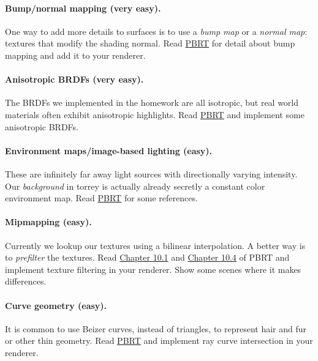 \paragraph{Bump/normal mapping (very easy).}
One way to add more details to surfaces is to use a \emph{bump map} or a \emph{normal map}: textures that modify the shading normal. Read \href{https://www.pbr-book.org/3ed-2018/Materials/Bump_Mapping}{PBRT} for detail about bump mapping and add it to your renderer.

\paragraph{Anisotropic BRDFs (very easy).}
The BRDFs we implemented in the homework are all isotropic, but real world materials often exhibit anisotropic highlights. Read \href{https://www.pbr-book.org/3ed-2018/Reflection_Models/Microfacet_Models}{PBRT} and implement some anisotropic BRDFs.

\paragraph{Environment maps/image-based lighting (easy).}
These are infinitely far away light sources with directionally varying intensity. Our \emph{background} in torrey is actually already secretly a constant color environment map. Read \href{https://www.pbr-book.org/3ed-2018/Light_Sources/Infinite_Area_Lights}{PBRT} for some references. 

\paragraph{Mipmapping (easy).}
Currently we lookup our textures using a bilinear interpolation. A better way is to \emph{prefilter} the textures. Read \href{https://www.pbr-book.org/3ed-2018/Texture/Sampling_and_Antialiasing.html}{Chapter 10.1} and \href{https://www.pbr-book.org/3ed-2018/Texture/Image_Texture}{Chapter 10.4} of PBRT and implement texture filtering in your renderer. Show some scenes where it makes differences.

\paragraph{Curve geometry (easy).}
It is common to use Beizer curves, instead of triangles, to represent hair and fur or other thin geometry. Read \href{https://www.pbr-book.org/3ed-2018/Shapes/Curves}{PBRT} and implement ray curve intersection in your renderer.

